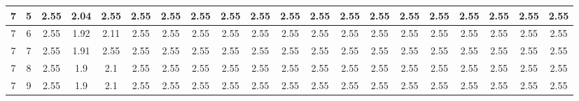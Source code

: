 \begin{landscape}
\begin{longtable}{|c|c||c||c|c|c|c|c|c|c|c||c|c|c|c|c|c|c|c|c|}
	7 & 5 & 2.55 & 2.04 & 2.55 & 2.55 & 2.55 & 2.55 & 2.55 & 2.55 & 2.55 & 2.55 & 2.55 & 2.55 & 2.55 & 2.55 & 2.55 & 2.55 & 2.55 & 2.55 \\ \hline
	7 & 6 & 2.55 & 1.92 & 2.11 & 2.55 & 2.55 & 2.55 & 2.55 & 2.55 & 2.55 & 2.55 & 2.55 & 2.55 & 2.55 & 2.55 & 2.55 & 2.55 & 2.55 & 2.55 \\ \hline
	7 & 7 & 2.55 & 1.91 & 2.55 & 2.55 & 2.55 & 2.55 & 2.55 & 2.55 & 2.55 & 2.55 & 2.55 & 2.55 & 2.55 & 2.55 & 2.55 & 2.55 & 2.55 & 2.55 \\ \hline
	7 & 8 & 2.55 & 1.9 & 2.1 & 2.55 & 2.55 & 2.55 & 2.55 & 2.55 & 2.55 & 2.55 & 2.55 & 2.55 & 2.55 & 2.55 & 2.55 & 2.55 & 2.55 & 2.55 \\ \hline
	7 & 9 & 2.55 & 1.9 & 2.1 & 2.55 & 2.55 & 2.55 & 2.55 & 2.55 & 2.55 & 2.55 & 2.55 & 2.55 & 2.55 & 2.55 & 2.55 & 2.55 & 2.55 & 2.55 \\ \hline
\end{longtable}

\end{landscape}\clearpage{}
